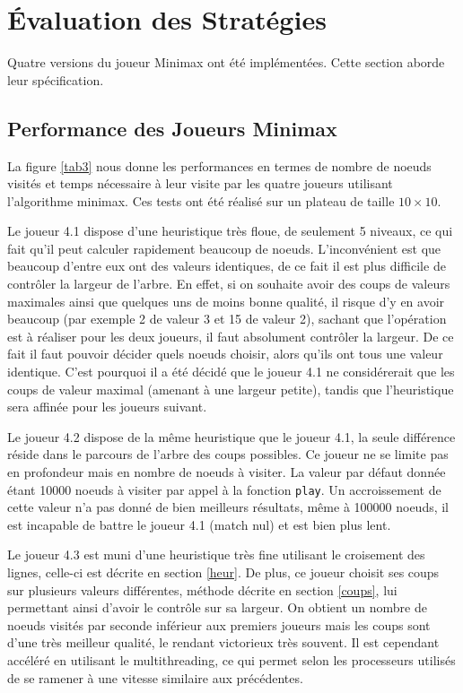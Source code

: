 \documentclass[a4paper,11pt]{article}
\begin{document}
\section{Évaluation des Stratégies}

Quatre versions du joueur Minimax ont été implémentées. Cette section aborde leur spécification.

\subsection{Performance des Joueurs Minimax}

La figure \ref{tab3} nous donne les performances en termes de nombre de noeuds visités et temps nécessaire à leur visite par les quatre joueurs utilisant l'algorithme minimax. Ces tests ont été réalisé sur un plateau de taille $10 \times 10$.

Le joueur 4.1 dispose d'une heuristique très floue, de seulement 5 niveaux, ce qui fait qu'il peut calculer rapidement beaucoup de noeuds. L'inconvénient est que beaucoup d'entre eux ont des valeurs identiques, de ce fait il est plus difficile de contrôler la largeur de l'arbre. En effet, si on souhaite avoir des coups de valeurs maximales ainsi que quelques uns de moins bonne qualité, il risque d'y en avoir beaucoup (par exemple 2 de valeur 3 et 15 de valeur 2), sachant que l'opération est à réaliser pour les deux joueurs, il faut absolument contrôler la largeur. De ce fait il faut pouvoir décider quels noeuds choisir, alors qu'ils ont tous une valeur identique. C'est pourquoi il a été décidé que le joueur 4.1 ne considérerait que les coups de valeur maximal (amenant à une largeur petite), tandis que l'heuristique sera affinée pour les joueurs suivant.

Le joueur 4.2 dispose de la même heuristique que le joueur 4.1, la seule différence réside dans le parcours de l'arbre des coups possibles. Ce joueur ne se limite pas en profondeur mais en nombre de noeuds à visiter. La valeur par défaut donnée étant 10000 noeuds à visiter par appel à la fonction \verb+play+. Un accroissement de cette valeur n'a pas donné de bien meilleurs résultats, même à 100000 noeuds, il est incapable de battre le joueur 4.1 (match nul) et est bien plus lent.

Le joueur 4.3 est muni d'une heuristique très fine utilisant le croisement des lignes, celle-ci est décrite en section \ref{heur}. De plus, ce joueur choisit ses coups sur plusieurs valeurs différentes, méthode décrite en section \ref{coups}, lui permettant ainsi d'avoir le contrôle sur sa largeur. On obtient un nombre de noeuds visités par seconde inférieur aux premiers joueurs mais les coups sont d'une très meilleur qualité, le rendant victorieux très souvent. Il est cependant accéléré en utilisant le multithreading, ce qui permet selon les processeurs utilisés de se ramener à une vitesse similaire aux précédentes.
\end{document}
